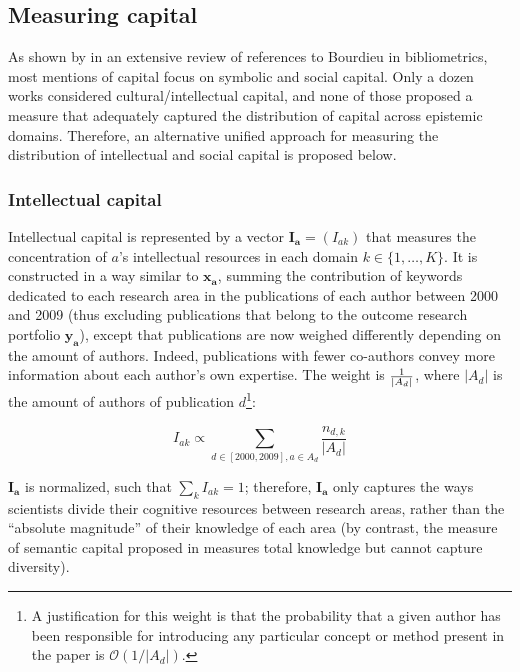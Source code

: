 \documentclass{article}
\begin{document}
\subsection{\label{sec:capital}Measuring capital}

As shown by \citet{Schirone2023} in an extensive review of references to Bourdieu in bibliometrics, most mentions of capital focus on symbolic and social capital. Only a dozen works considered cultural/intellectual capital, and none of those proposed a measure that adequately captured the distribution of capital across epistemic domains. Therefore, an alternative unified approach for measuring the distribution of intellectual and social capital is proposed below.

\subsubsection{Intellectual capital}

Intellectual capital is represented by a vector $\bm{I_a}=(I_{ak})$ that measures the concentration of $a$'s intellectual resources in each domain $k \in \{1,\dots,K\}$. It is constructed in a way similar to $\bm{x_{a}}$, summing the contribution of keywords dedicated to each research area in the publications of each author between 2000 and 2009 (thus excluding publications that belong to the outcome research portfolio $\bm{y_a}$), except that publications are now weighed differently depending on the amount of authors. Indeed, publications with fewer co-authors convey more information about each author's own expertise. The weight is $1 \over |A_d|$, where $|A_d|$ is the amount of authors of publication $d$\footnote{A justification for this weight is that the probability that a given author has been responsible for introducing any particular concept or method present in the paper is $\mathcal{O}(1/|A_d|)$. }:

\begin{equation}
    I_{ak} \propto  \sum_{d\in [2000,2009],a\in A_d} \dfrac{n_{d,k}}{|A_d|}
\end{equation}

$\bm{I_a}$ is normalized, such that $\sum_k I_{ak}=1$; therefore, $\bm{I_a}$ only captures the ways scientists divide their cognitive resources between research areas, rather than the ``absolute magnitude'' of their knowledge of each area (by contrast, the measure of  semantic capital proposed in \citealt{Roth2010} measures total knowledge but cannot capture diversity). 
\end{document}
